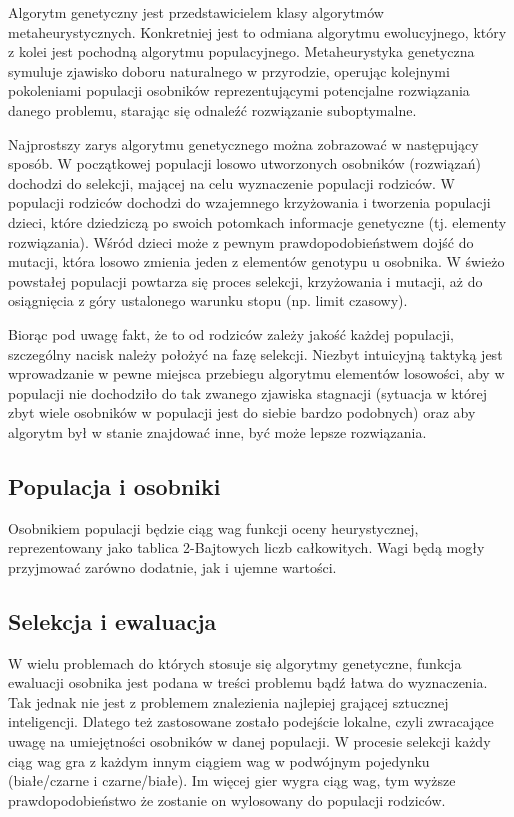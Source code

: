 Algorytm genetyczny jest przedstawicielem klasy algorytmów metaheurystycznych. Konkretniej jest to odmiana algorytmu ewolucyjnego, który z kolei jest pochodną algorytmu populacyjnego. Metaheurystyka genetyczna symuluje zjawisko doboru naturalnego w przyrodzie, operując kolejnymi pokoleniami populacji osobników reprezentującymi potencjalne rozwiązania danego problemu, starając się odnaleźć rozwiązanie suboptymalne.

Najprostszy zarys algorytmu genetycznego można zobrazować w następujący sposób. W początkowej populacji losowo utworzonych osobników (rozwiązań) dochodzi do selekcji, mającej na celu wyznaczenie populacji rodziców. W populacji rodziców dochodzi do wzajemnego krzyżowania i tworzenia populacji dzieci, które dziedziczą po swoich potomkach informacje genetyczne (tj. elementy rozwiązania). Wśród dzieci może z pewnym prawdopodobieństwem dojść do mutacji, która losowo zmienia jeden z elementów genotypu u osobnika. W świeżo powstałej populacji powtarza się proces selekcji, krzyżowania i mutacji, aż do osiągnięcia z góry ustalonego warunku stopu (np. limit czasowy).

Biorąc pod uwagę fakt, że to od rodziców zależy jakość każdej populacji, szczególny nacisk należy położyć na fazę selekcji. Niezbyt intuicyjną taktyką jest wprowadzanie w pewne miejsca przebiegu algorytmu elementów losowości, aby w populacji nie dochodziło do tak zwanego zjawiska stagnacji (sytuacja w której zbyt wiele osobników w populacji jest do siebie bardzo podobnych) oraz aby algorytm był w stanie znajdować inne, być może lepsze rozwiązania.

\subsection{Populacja i osobniki}

Osobnikiem populacji będzie ciąg wag funkcji oceny heurystycznej, reprezentowany jako tablica 2-Bajtowych liczb całkowitych. Wagi będą mogły przyjmować zarówno dodatnie, jak i ujemne wartości.

\subsection{Selekcja i ewaluacja}

W wielu problemach do których stosuje się algorytmy genetyczne, funkcja ewaluacji osobnika jest podana w treści problemu bądź łatwa do wyznaczenia. Tak jednak nie jest z problemem znalezienia najlepiej grającej sztucznej inteligencji. Dlatego też zastosowane zostało podejście lokalne, czyli zwracające uwagę na umiejętności osobników w danej populacji. W procesie selekcji każdy ciąg wag gra z każdym innym ciągiem wag w podwójnym pojedynku (białe/czarne i czarne/białe). Im więcej gier wygra ciąg wag, tym wyższe prawdopodobieństwo że zostanie on wylosowany do populacji rodziców.

